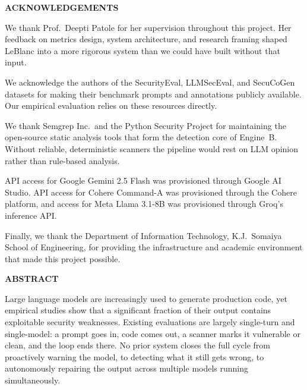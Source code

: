 \documentclass[12pt,a4paper]{report}
\begin{document}
\newpage
\thispagestyle{empty}
\begin{center}{\Large\bfseries ACKNOWLEDGEMENTS}\end{center}
\vspace{0.25in}
\noindent We thank Prof.\ Deepti Patole for her supervision throughout this
project. Her feedback on metrics design, system architecture, and research
framing shaped LeBlanc into a more rigorous system than we could have built
without that input.

\vspace{0.15in}
\noindent We acknowledge the authors of the SecurityEval, LLMSecEval, and
SecuCoGen datasets for making their benchmark prompts and annotations publicly
available. Our empirical evaluation relies on these resources directly.

\vspace{0.15in}
\noindent We thank Semgrep Inc.\ and the Python Security Project for maintaining
the open-source static analysis tools that form the detection core of Engine~B.
Without reliable, deterministic scanners the pipeline would rest on LLM opinion
rather than rule-based analysis.

\vspace{0.15in}
\noindent API access for Google Gemini 2.5 Flash was provisioned through Google
AI Studio. API access for Cohere Command-A was provisioned through the Cohere
platform, and access for Meta Llama 3.1-8B was provisioned through Groq's
inference API.

\vspace{0.15in}
\noindent Finally, we thank the Department of Information Technology, K.J.\
Somaiya School of Engineering, for providing the infrastructure and academic
environment that made this project possible.

\newpage
\thispagestyle{empty}
\begin{center}{\Large\bfseries ABSTRACT}\end{center}
\vspace{0.2in}
\noindent Large language models are increasingly used to generate production code,
yet empirical studies show that a significant fraction of their output contains
exploitable security weaknesses. Existing evaluations are largely single-turn and
single-model: a prompt goes in, code comes out, a scanner marks it vulnerable or
clean, and the loop ends there. No prior system closes the full cycle from
proactively warning the model, to detecting what it still gets wrong, to
autonomously repairing the output across multiple models running simultaneously.
\end{document}
